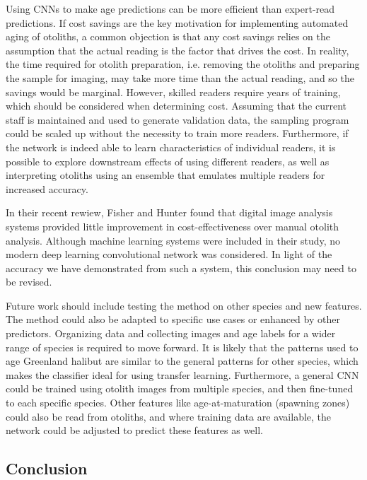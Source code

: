 \documentclass[10pt,letterpaper]{article}
\begin{document}
Using CNNs to make age predictions can be more efficient than expert-read predictions. If cost savings are the key motivation for implementing automated aging of otoliths, a common objection is that any cost savings relies on the assumption that the actual reading is the factor that drives the cost. In reality, the time required for otolith preparation, i.e. removing the otoliths and preparing the sample for imaging, may take more time than the actual reading, and so the savings would be marginal. However, skilled readers require years of training, which should be considered when determining cost. Assuming that the current staff is maintained and used to generate validation data, the sampling program could be scaled up without the necessity to train more readers. Furthermore, if the network is indeed able to learn characteristics of individual readers, it is possible to explore downstream effects of using different readers, as well as interpreting otoliths using an ensemble that emulates multiple readers for increased accuracy.

In their recent rewiew, Fisher and Hunter \cite{fisher2018digital}
found that digital image analysis systems provided little improvement in
cost-effectiveness over manual otolith analysis.  Although machine
learning systems were included in their study, no modern deep learning
convolutional network was considered.  In light of the accuracy we
have demonstrated from such a system, this conclusion may need to be
revised.

Future work should include testing the method on other species and new features. The method could also be adapted to specific use cases or enhanced by other predictors. Organizing data and collecting images and age labels for a wider range of species is required to move forward. It is likely that the patterns used to age Greenland halibut are similar to the general patterns for other species, which makes the classifier ideal for using transfer learning. Furthermore, a general CNN could be trained using otolith images from multiple species, and then fine-tuned to each specific species. Other features like age-at-maturation (spawning zones) could also be read from otoliths, and where training data are available, the network could be adjusted to predict these features as well.

\subsection*{Conclusion}
\end{document}
